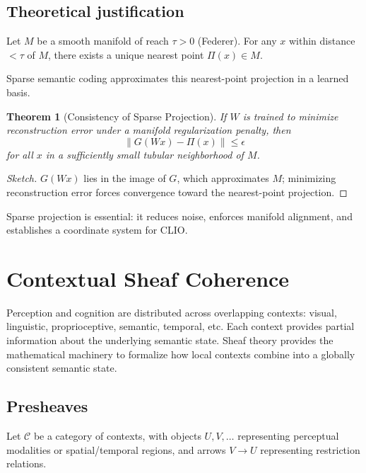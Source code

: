 \documentclass[11pt,a4paper,twocolumn]{article}
\newtheorem{theorem}{Theorem}[section]
\begin{document}
\subsection{Theoretical justification}

Let $M$ be a smooth manifold of reach $\tau > 0$ (Federer).  
For any $x$ within distance $< \tau$ of $M$,
there exists a unique nearest point $\Pi(x) \in M$.  

Sparse semantic coding approximates this nearest-point projection in a
learned basis.

\begin{theorem}[Consistency of Sparse Projection]
If $W$ is trained to minimize reconstruction error under a manifold
regularization penalty, then
\[
\|G(Wx) - \Pi(x)\| \le \epsilon
\]
for all $x$ in a sufficiently small tubular neighborhood of $M$.
\end{theorem}

\begin{proof}[Sketch]
$G(Wx)$ lies in the image of $G$, which approximates $M$;
minimizing reconstruction error forces convergence toward the nearest-point projection.
\end{proof}

Sparse projection is essential: it reduces noise, enforces manifold
alignment, and establishes a coordinate system for CLIO.



\section{Contextual Sheaf Coherence}

Perception and cognition are distributed across overlapping contexts:
visual, linguistic, proprioceptive, semantic, temporal, etc.  
Each context provides partial information about the underlying semantic
state.  
Sheaf theory provides the mathematical machinery to formalize how
local contexts combine into a globally consistent semantic state.

\subsection{Presheaves}

Let $\mathcal{C}$ be a category of contexts, with objects $U,V,\ldots$
representing perceptual modalities or spatial/temporal regions, and
arrows $V \to U$ representing restriction relations.
\end{document}
